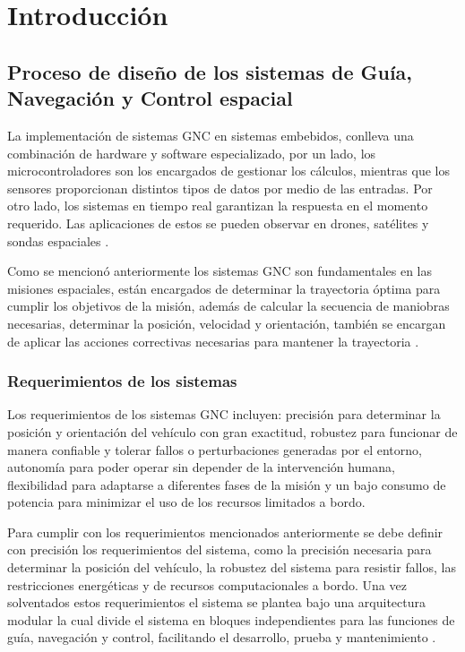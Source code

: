 
\chapter{Introducción}
\label{chp:intro}

\section{Proceso de diseño de los sistemas de Guía, Navegación y Control espacial}

La implementación de sistemas GNC en sistemas embebidos, conlleva una combinación de 
hardware y software especializado, por un lado, los microcontroladores son los encargados 
de gestionar los cálculos, mientras que los sensores proporcionan distintos tipos de datos 
por medio de las entradas. Por otro lado, los sistemas en tiempo real garantizan la respuesta 
en el momento requerido. Las aplicaciones de estos se pueden observar en drones, satélites y 
sondas espaciales \cite{MathWorks2024_ss}.

Como se mencionó anteriormente los sistemas GNC son fundamentales en las misiones espaciales, 
están encargados de determinar la trayectoria óptima para cumplir los objetivos de la misión, 
además de calcular la secuencia de maniobras necesarias, determinar la posición, velocidad y 
orientación, también se encargan de aplicar las acciones correctivas necesarias para mantener 
la trayectoria \cite{hewing2023enhancing}.


\subsection{Requerimientos de los sistemas}

Los requerimientos de los sistemas GNC incluyen: precisión para determinar la posición 
y orientación del vehículo con gran exactitud, robustez para funcionar de manera confiable 
y tolerar fallos o perturbaciones generadas por el entorno, autonomía para poder operar sin 
depender de la intervención humana, flexibilidad para adaptarse a diferentes fases de la misión 
y un bajo consumo de potencia para minimizar el uso de los recursos limitados a bordo. 

Para cumplir con los requerimientos mencionados anteriormente se debe definir con precisión 
los requerimientos del sistema, como la precisión necesaria para determinar la posición del 
vehículo, la robustez del sistema para resistir fallos, las restricciones energéticas y de 
recursos computacionales a bordo. Una vez solventados estos requerimientos el sistema se 
plantea bajo una arquitectura modular la cual divide el sistema en bloques independientes 
para las funciones de guía, navegación y control, facilitando el desarrollo, prueba 
y mantenimiento \cite{AEM2017}. 


